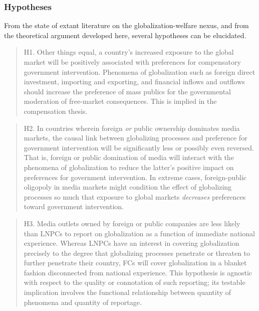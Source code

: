 \documentclass[12pt]{report}
\begin{document}
\subsubsection{Hypotheses}
From the state of extant literature on the globalization-welfare nexus, and from the theoretical argument developed here, several hypotheses can be elucidated.

\singlespacing
\begin{quote}
H1. Other things equal, a country's increased exposure to the global market will be positively associated with preferences for compensatory government intervention. Phenomena of globalization such as foreign direct investment, importing and exporting, and financial inflows and outflows should increase the preference of mass publics for the governmental moderation of free-market consequences. This is implied in the compensation thesis.
\end{quote}
\doublespacing

\singlespacing
\begin{quote}
H2. In countries wherein foreign \emph{or} public ownership dominates media markets, the causal link between globalizing processes and preference for government intervention will be significantly less or possibly even reversed. That is, foreign or public domination of media will interact with the phenomena of globalization to reduce the latter's positive impact on preferences for government intervention. In extreme cases, foreign-public oligopoly in media markets might condition the effect of globalizing processes so much that exposure to global markets \emph{decreases} preferences toward government intervention.
\end{quote}
\doublespacing

\singlespacing
\begin{quote}
H3. Media outlets owned by foreign or public companies are less likely than LNPCs to report on globalization as a function of immediate national experience. Whereas LNPCs have an interest in covering globalization precisely to the degree that globalizing processes penetrate or threaten to further penetrate their country, FCs will cover globalization in a blanket fashion disconnected from national experience. This hypothesis is agnostic with respect to the quality or connotation of such reporting; its testable implication involves the functional relationship between quantity of phenomena and quantity of reportage.
\end{quote}
\doublespacing
\end{document}
